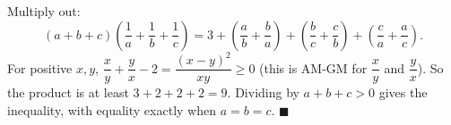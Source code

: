 Multiply out:
\[(a+b+c)\left(\dfrac1a+\dfrac1b+\dfrac1c\right)=3+\left(\dfrac ab+\dfrac ba\right)+\left(\dfrac bc+\dfrac cb\right)+\left(\dfrac ca+\dfrac ac\right).\]
For positive $x,y$, $\dfrac xy+\dfrac yx-2=\dfrac{(x-y)^2}{xy}\ge0$ (this is AM-GM for $\dfrac xy$ and $\dfrac yx$). So the product is at least $3+2+2+2=9$. Dividing by $a+b+c>0$ gives the inequality, with equality exactly when $a=b=c$. $\blacksquare$
